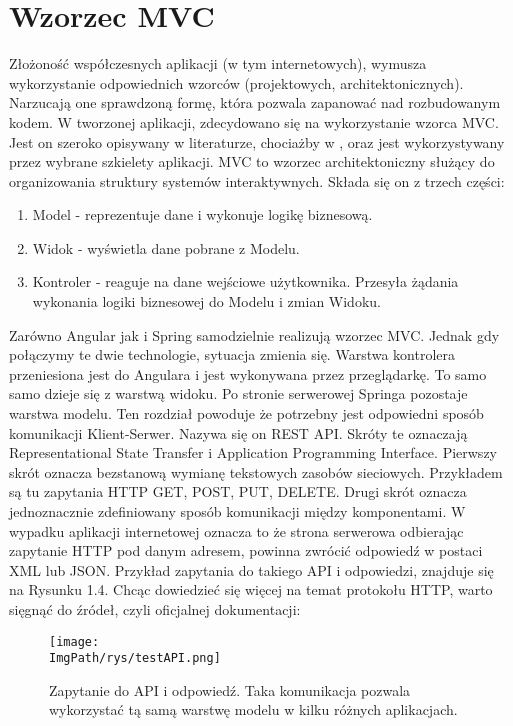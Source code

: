 \documentclass[a4paper,12pt,twoside,openany]{report}
\newcommand{\ImgPath}{.}
\begin{document}
\section{Wzorzec MVC}
Złożoność współczesnych aplikacji (w tym internetowych), wymusza wykorzystanie odpowiednich wzorców (projektowych, architektonicznych). Narzucają one sprawdzoną formę, która pozwala zapanować nad rozbudowanym kodem. W tworzonej aplikacji, zdecydowano się na wykorzystanie wzorca MVC. Jest on szeroko opisywany w literaturze, chociażby w \cite{MVC}, oraz jest wykorzystywany przez wybrane szkielety aplikacji. MVC to wzorzec architektoniczny służący do organizowania struktury systemów interaktywnych. Składa się on z trzech części:
	\begin{enumerate}
		\item Model - reprezentuje dane i wykonuje logikę biznesową.
		\item Widok - wyświetla dane pobrane z Modelu.
		\item Kontroler - reaguje na dane wejściowe użytkownika. Przesyła żądania wykonania logiki biznesowej do Modelu i zmian Widoku. 
	\end{enumerate}
Zarówno Angular jak i Spring samodzielnie realizują wzorzec MVC. Jednak gdy połączymy te dwie technologie, sytuacja zmienia się. Warstwa kontrolera przeniesiona jest do Angulara i jest wykonywana przez przeglądarkę. To samo samo dzieje się z warstwą widoku. Po stronie serwerowej Springa pozostaje warstwa modelu. Ten rozdział powoduje że potrzebny jest odpowiedni sposób komunikacji Klient-Serwer. Nazywa się on REST API. Skróty te oznaczają Representational State Transfer i Application Programming Interface. Pierwszy skrót oznacza bezstanową wymianę tekstowych zasobów sieciowych. Przykładem są tu zapytania HTTP GET, POST, PUT, DELETE. Drugi skrót oznacza jednoznacznie zdefiniowany sposób komunikacji między komponentami. W wypadku aplikacji internetowej oznacza to że strona serwerowa odbierając zapytanie HTTP pod danym adresem, powinna zwrócić odpowiedź w postaci XML lub JSON. Przykład zapytania do takiego API i odpowiedzi, znajduje się na Rysunku 1.4. Chcąc dowiedzieć się więcej na temat protokołu HTTP, warto sięgnąć do źródeł, czyli oficjalnej dokumentacji: \cite{HTTP}
		\begin{figure}[!htbp]
			\begin{center}
				\centering
				\texttt{[image: \\ImgPath/rys/testAPI.png]}
			\end{center}
			\caption{Zapytanie do API i odpowiedź. Taka komunikacja pozwala wykorzystać tą samą warstwę modelu w kilku różnych aplikacjach.}
			\label{UMLTS}
		\end{figure}
\end{document}
